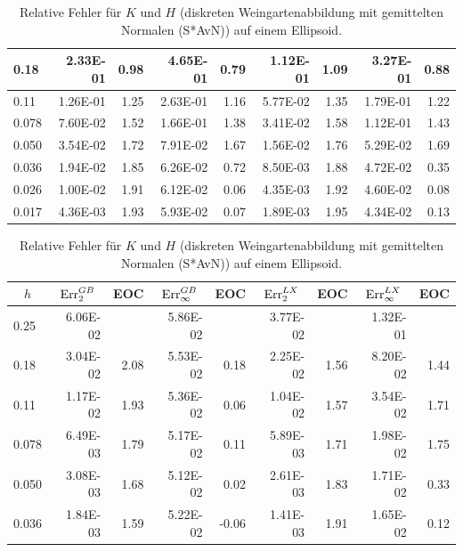 \begin{table}[htbp]
\begin{tabular}{|l|r|r|r|r|r|r|r|r|}
            0.18 & 2.33E-01 & 0.98 & 4.65E-01 & 0.79 & 1.12E-01 & 1.09 & 3.27E-01 & 0.88 \\ \hline
            0.11 & 1.26E-01 & 1.25 & 2.63E-01 & 1.16 & 5.77E-02 & 1.35 & 1.79E-01 & 1.22 \\ \hline
            0.078 & 7.60E-02 & 1.52 & 1.66E-01 & 1.38 & 3.41E-02 & 1.58 & 1.12E-01 & 1.43 \\ \hline
            0.050 & 3.54E-02 & 1.72 & 7.91E-02 & 1.67 & 1.56E-02 & 1.76 & 5.29E-02 & 1.69 \\ \hline
            0.036 & 1.94E-02 & 1.85 & 6.26E-02 & 0.72 & 8.50E-03 & 1.88 & 4.72E-02 & 0.35 \\ \hline
            0.026 & 1.00E-02 & 1.91 & 6.12E-02 & 0.06 & 4.35E-03 & 1.92 & 4.60E-02 & 0.08 \\ \hline
            0.017 & 4.36E-03 & 1.93 & 5.93E-02 & 0.07 & 1.89E-03 & 1.95 & 4.34E-02 & 0.13 \\ \hline
      \end{tabular}
      \caption[Weingarten auf einem Ellipsoid]{Relative Fehler für \( K \) und \( H \) (diskreten Weingartenabbildung mit gemittelten
      Normalen (S*AvN)) auf einem Ellipsoid.}
      \label{tabHeineCWeingartenAvN}
      \vspace{10pt}
      \begin{tabular}{|l|r|r|r|r|r|r|r|r|}
      \hline
      \multicolumn{1}{|c|}{\rule{0pt}{11pt}\( h \)} & \multicolumn{1}{c|}{\( \text{Err}_{2}^{GB} \)} & \multicolumn{1}{c|}{EOC} & 
           \multicolumn{1}{c|}{\( \text{Err}_{\infty}^{GB} \)} & \multicolumn{1}{c|}{EOC} & \multicolumn{1}{c|}{\( \text{Err}_{2}^{LX} \)} &
           \multicolumn{1}{c|}{EOC} & \multicolumn{1}{c|}{\( \text{Err}_{\infty}^{LX} \)} & \multicolumn{1}{c|}{EOC} \\ \hline
           0.25 & 6.06E-02 & \multicolumn{1}{l|}{} & 5.86E-02 & \multicolumn{1}{l|}{} & 3.77E-02 & \multicolumn{1}{l|}{} & 1.32E-01 & \multicolumn{1}{l|}{} \\ \hline
            0.18 & 3.04E-02 & 2.08 & 5.53E-02 & 0.18 & 2.25E-02 & 1.56 & 8.20E-02 & 1.44 \\ \hline
            0.11 & 1.17E-02 & 1.93 & 5.36E-02 & 0.06 & 1.04E-02 & 1.57 & 3.54E-02 & 1.71 \\ \hline
            0.078 & 6.49E-03 & 1.79 & 5.17E-02 & 0.11 & 5.89E-03 & 1.71 & 1.98E-02 & 1.75 \\ \hline
            0.050 & 3.08E-03 & 1.68 & 5.12E-02 & 0.02 & 2.61E-03 & 1.83 & 1.71E-02 & 0.33 \\ \hline
            0.036 & 1.84E-03 & 1.59 & 5.22E-02 & -0.06 & 1.41E-03 & 1.91 & 1.65E-02 & 0.12 \\ \hline

\end{tabular}
\end{table}
